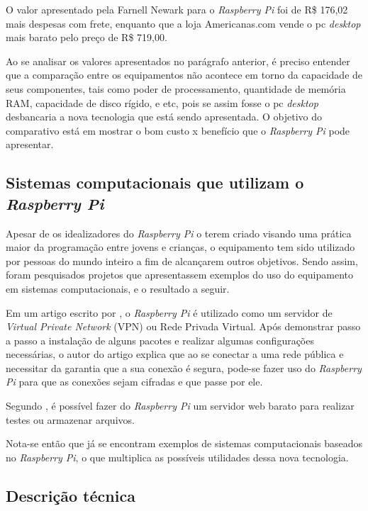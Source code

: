 O valor apresentado pela Farnell Newark para o \textit{Raspberry Pi} foi de R\$ 176,02 mais despesas com frete, enquanto que a loja Americanas.com vende o pc \textit{desktop} mais barato pelo preço de R\$ 719,00.

Ao se analisar os valores apresentados no parágrafo anterior, é preciso entender que a comparação entre os equipamentos não acontece em torno da capacidade de seus componentes, tais como poder de processamento, quantidade de memória RAM, capacidade de disco rígido, e etc, pois se assim fosse o pc \textit{desktop} desbancaria a nova tecnologia que está sendo apresentada. O objetivo do comparativo está em mostrar o bom custo x benefício que o  \textit{Raspberry Pi} pode apresentar.

\subsection{Sistemas computacionais que utilizam o \textit{Raspberry Pi}}

Apesar de os idealizadores do \textit{Raspberry Pi} o terem criado visando uma prática maior da programação entre jovens e crianças, o equipamento tem sido utilizado por pessoas do mundo inteiro a fim de alcançarem outros objetivos. Sendo assim, foram pesquisados projetos que apresentassem exemplos do uso do equipamento em sistemas computacionais, e o resultado a seguir.

Em um artigo escrito por , o \textit{Raspberry Pi} é utilizado como um servidor de \textit{Virtual Private Network} (VPN) ou Rede Privada Virtual. Após demonstrar passo a passo a instalação de alguns pacotes e realizar algumas configurações necessárias, o autor do artigo explica que ao se conectar a uma rede pública e necessitar da garantia que a sua conexão é segura, pode-se fazer uso do \textit{Raspberry Pi} para que as conexões sejam cifradas e que passe por ele.

Segundo , é possível fazer do \textit{Raspberry Pi} um servidor web barato para realizar testes ou armazenar arquivos.

Nota-se então que já se encontram exemplos de sistemas computacionais baseados no \textit{Raspberry Pi}, o que multiplica as possíveis utilidades dessa nova tecnologia.

\subsection{Descrição técnica}

